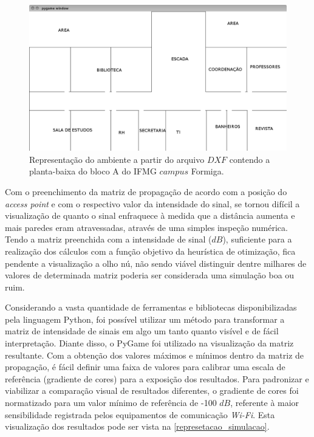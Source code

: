 \documentclass[
	12pt,				%
	twoside,			%
	a4paper,			%
	english,			%
	french,				%
	spanish,			%
	brazil				%
	]{abntex2}
\begin{document}
\begin{figure}[!ht]
    \caption{\label{repre_ambiente_dxf_2} Representação do ambiente a partir do arquivo $DXF$ contendo a planta-baixa do bloco A do IFMG $campus$ Formiga.}
    \begin{center}
        \includegraphics[scale=0.4]{imagens/planta-labels.jpg}
    \end{center}
\end{figure}

Com o preenchimento da matriz de propagação de acordo com a posição do
\emph{access point} e com o respectivo valor da intensidade do sinal, se
tornou difícil a visualização de quanto o sinal enfraquece à medida que
a distância aumenta e mais paredes eram atravessadas, através de uma
simples inspeção numérica. Tendo a matriz preenchida com a intensidade
de sinal (\(dB\)), suficiente para a realização dos cálculos com a
função objetivo da heurística de otimização, fica pendente a
visualização a olho nú, não sendo viável distinguir dentre milhares de
valores de determinada matriz poderia ser considerada uma simulação boa
ou ruim.

Considerando a vasta quantidade de ferramentas e bibliotecas
disponibilizadas pela linguagem Python, foi possível utilizar um método
para transformar a matriz de intensidade de sinais em algo um tanto
quanto visível e de fácil interpretação. Diante disso, o PyGame foi
utilizado na visualização da matriz resultante. Com a obtenção dos
valores máximos e mínimos dentro da matriz de propagação, é fácil
definir uma faixa de valores para calibrar uma escala de referência
(gradiente de cores) para a exposição dos resultados. Para padronizar e
viabilizar a comparação visual de resultados diferentes, o gradiente de
cores foi normatizado para um valor mínimo de referência de -100 \(dB\),
referente à maior sensibilidade registrada pelos equipamentos de
comunicação \emph{Wi-Fi}. Esta visualização dos resultados pode ser
vista na \autoref{represetacao_simulacao}.
\end{document}
